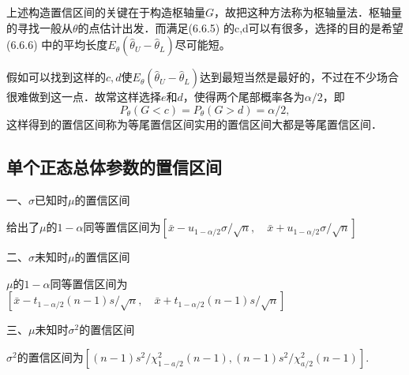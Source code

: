 上述构造置信区间的关键在于构造枢轴量$G$，故把这种方法称为枢轴量法．枢轴量的寻找一般从$\theta$的点估计出发．而满足(6.6.5) 的c,d可以有很多，选择的目的是希望 (6.6.6) 中的平均长度$E_\theta(\hat{\theta}_U-\hat{\theta}_L)$尽可能短。

假如可以找到这样的$c,d$使$E_\theta(\hat{\theta}_{U}-\hat{\theta}_{L})$达到最短当然是最好的，不过在不少场合很难做到这一点．故常这样选择$e$和$d$，使得两个尾部概率各为$\alpha/2$，即
\begin{equation}
    P_{\theta}(G <c)=P_{\theta}(G > d)=\alpha/2,
\end{equation}
这样得到的置信区间称为等尾置信区间实用的置信区间大都是等尾置信区间．

\subsection{单个正态总体参数的置信区间}

一、$\sigma$已知时$\mu$的置信区间

给出了$\mu$的$1-\alpha$同等置信区间为$[\bar{x}-u_{1-\alpha/2}\sigma/\sqrt{n},\quad\bar{x}+u_{1-\alpha/2}\sigma/\sqrt{n}]$


二、$\sigma$未知时$\mu$的置信区间

$\mu$的$1-\alpha$同等置信区间为$[\bar{x}-t_{1-\alpha/2}(n-1)s/\sqrt{n},\quad\bar{x}+t_{1-\alpha/2}(n-1)s/\sqrt{n}]$

三、$\mu$未知时$\sigma^2$的置信区间

$\sigma^2$的置信区间为$\left[(n-1)s^{2}/\chi_{1-a/2}^{2}(n-1),(n-1)s^{2}/\chi_{a/2}^{2}(n-1)\right].$

